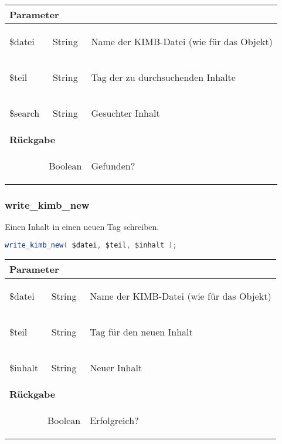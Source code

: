 \documentclass[paper=A4,pagesize=auto,12pt,headinclude=true,footinclude=true,BCOR=0mm,DIV=calc]{scrartcl}
\begin{document}
	    \begin{tabular}{|lcp{}|}
		    \hline
		      \multicolumn{3}{|l|}{ \textbf{Parameter} } \\
		    \hline
		      \$datei & String & \begin{itshape} Name der KIMB-Datei (wie für das Objekt)\end{itshape} \\
		      \$teil & String & \begin{itshape} Tag der zu durchsuchenden Inhalte \end{itshape} \\
		      \$search & String & \begin{itshape} Gesuchter Inhalt \end{itshape} \\
		    \hline
		      \multicolumn{3}{|l|}{ \textbf{Rückgabe} } \\
		    \hline
			     & Boolean & \begin{itshape} Gefunden? \end{itshape} \\
		    \hline
	    \end{tabular}
	   
  \subsubsection{write\_kimb\_new}
	    Einen Inhalt in einen neuen Tag schreiben.
	    \begin{lstlisting}[gobble=4,language=Java]
	      write_kimb_new( $datei, $teil, $inhalt );
	    \end{lstlisting}
	    
	    \begin{tabular}{|lcp{}|}
		    \hline
		      \multicolumn{3}{|l|}{ \textbf{Parameter} } \\
		    \hline
		      \$datei & String & \begin{itshape} Name der KIMB-Datei (wie für das Objekt)\end{itshape} \\
		      \$teil & String & \begin{itshape} Tag für den neuen Inhalt \end{itshape} \\
		      \$inhalt & String & \begin{itshape} Neuer Inhalt \end{itshape} \\
		    \hline
		      \multicolumn{3}{|l|}{ \textbf{Rückgabe} } \\
		    \hline
			     & Boolean & \begin{itshape} Erfolgreich? \end{itshape} \\
		    \hline
	    \end{tabular}
\end{document}
